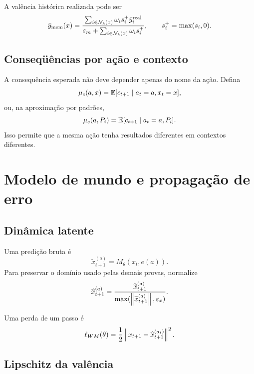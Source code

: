 A valência histórica realizada pode ser
\begin{equation}
\bar y_{\rm mem}(x)=
\frac{\sum_{i\in\mathcal N_k(x)}\omega_i s_i^+\bar y_i^{\rm real}}
{\varepsilon_m+\sum_{i\in\mathcal N_k(x)}\omega_i s_i^+},
\qquad s_i^+=\max(s_i,0).
\label{eq:weighted_memory}
\end{equation}

\subsection{Conseqüências por ação e contexto}

A consequência esperada não deve depender apenas do nome da ação. Defina
\begin{equation}
\mu_c(a,x)=\operatorname{\mathbb{E}}[c_{t+1}\mid a_t=a,x_t=x],
\end{equation}
ou, na aproximação por padrões,
\begin{equation}
\mu_c(a,P_i)=\operatorname{\mathbb{E}}[c_{t+1}\mid a_t=a,P_i].
\end{equation}
Isso permite que a mesma ação tenha resultados diferentes em contextos diferentes.

\section{Modelo de mundo e propagação de erro}

\subsection{Dinâmica latente}

Uma predição bruta é
\begin{equation}
\widetilde x_{t+1}^{(a)}=M_\theta(x_t,e(a)).
\end{equation}
Para preservar o domínio usado pelas demais provas, normalize
\begin{equation}
\widehat x_{t+1}^{(a)}=
\frac{\widetilde x_{t+1}^{(a)}}
{\max(\left\lVert \widetilde x_{t+1}^{(a)} \right\rVert,\varepsilon_x)}.
\label{eq:model_normalization}
\end{equation}

Uma perda de um passo é
\begin{equation}
\ell_{WM}(\theta)=\frac12\left\lVert x_{t+1}-\widehat x_{t+1}^{(a_t)} \right\rVert^2.
\end{equation}

\subsection{Lipschitz da valência}

